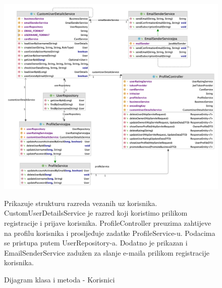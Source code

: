             \begin{figure}[H]
                \includegraphics[width=\textwidth]{slike/DR-users.png} %
                \caption{Dijagram klasa i metoda - Korisnici}
                {\small Prikazuje strukturu razreda vezanih uz korisnika. CustomUserDetailsService je razred koji koristimo prilikom registracije i prijave korisnika. ProfileController preuzima zahtijeve na profilu korisnika i prosljeđuje zadatke ProfileService-u. Podacima se pristupa putem UserRepository-a. Dodatno je prikazan i EmailSenderService zadužen za slanje e-maila prilikom registracije korisnika.}
                \label{fig:CSR_User} %
            \end{figure}
            \\

